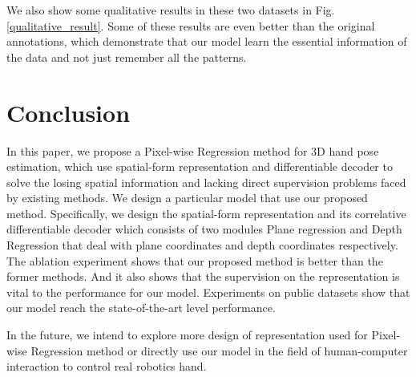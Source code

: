 \documentclass[journal]{IEEEtran}
\begin{document}
We also show some qualitative results in these two datasets in Fig\@. \ref{qualitative_result}. 
Some of these results are even better than the original annotations, 
which demonstrate that our model learn the essential information of the data and not just remember all the patterns.


\section{Conclusion}
\label{Conclusion}

In this paper, we propose a Pixel-wise Regression method for 3D hand pose estimation, 
which use spatial-form representation and differentiable decoder to solve the losing spatial information and 
lacking direct supervision problems faced by existing methods. 
We design a particular model that use our proposed method. 
Specifically, we design the spatial-form representation and its correlative differentiable decoder 
which consists of two modules Plane regression and Depth Regression 
that deal with plane coordinates and depth coordinates respectively. 
The ablation experiment shows that our proposed method is better than the former methods. 
And it also shows that the supervision on the representation is vital to the performance for our model. 
Experiments on public datasets show that our model reach the state-of-the-art level performance. 

In the future, we intend to explore more design of representation used for Pixel-wise Regression method or 
directly use our model in the field of human-computer interaction to control real robotics hand.






















\ifCLASSOPTIONcaptionsoff
  \newpage
\fi









\end{document}
